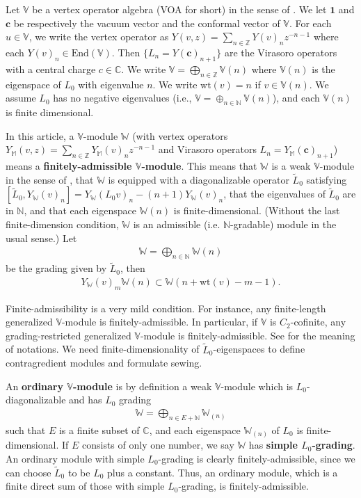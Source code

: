 \documentclass[12pt,a4paper,notitlepage]{article}
\theoremstyle{definition}
\theoremstyle{plain}
\newcommand{\wtd}{\widetilde}
\newcommand{\End}{\mathrm{End}} %
\newcommand{\id}{\mathbf{1}}
\newcommand{\Vbb}{\mathbb V}
\newcommand{\Wbb}{\mathbb W}
\newcommand{\Mbb}{\mathbb M}
\newcommand{\Cbb}{\mathbb C}
\newcommand{\Nbb}{\mathbb N}
\newcommand{\Zbb}{\mathbb Z}
\newcommand{\cbf}{\mathbf c}
\newcommand{\wt}{\mathrm{wt}}
\numberwithin{equation}{section}
\begin{document}
Let $\Vbb$ be a vertex operator algebra (VOA for short) in the sense of \cite{FHL93}. We let $\id$ \index{1@$\id$} and $\cbf$ \index{c@$\cbf$} be respectively the vacuum vector and the conformal vector of $\Vbb$. For each $u\in\Vbb$, we write the vertex operator as $Y(v,z)=\sum_{n\in\Zbb}Y(v)_nz^{-n-1}$ where each $Y(v)_n\in\End(\Vbb)$. Then $\{L_n=Y(\cbf)_{n+1} \}$ are the Virasoro operators with a central charge  $c\in\Cbb$. We write $\Vbb=\bigoplus_{n\in\Zbb}\Vbb(n)$ where $\Vbb(n)$ is the eigenspace of $L_0$ with eigenvalue $n$. We write $\wt(v)=n$ if $v\in\Vbb(n)$. We assume $L_0$ has no negative eigenvalues (i.e., $\Vbb=\oplus_{n\in\Nbb}\Vbb(n)$), and each $\Vbb(n)$ is finite dimensional.


In this article,  a $\Vbb$-module $\Wbb$ (with vertex operators $Y_\Mbb(v,z)=\sum_{n\in\Zbb}Y_\Mbb(v)_nz^{-n-1}$ and Virasoro operators $L_n=Y_\Mbb(\cbf)_{n+1}$) means a \textbf{finitely-admissible $\Vbb$-module}. This means that $\Wbb$ is a weak $\Vbb$-module in the sense of \cite{DLM97}, that $\Wbb$ is equipped with a diagonalizable operator $\wtd L_0$ satisfying $[\wtd L_0,Y_\Wbb(v)_n]=Y_\Wbb(L_0 v)_n-(n+1)Y_\Wbb(v)_n$, \index{L0@$\wtd L_0$}  that the eigenvalues of $\wtd L_0$ are in $\Nbb$, and that each eigenspace $\Wbb(n)$ is finite-dimensional. (Without the last finite-dimension condition, $\Wbb$ is an admissible (i.e. $\Nbb$-gradable) module in the usual sense.) Let \index{W@$\Wbb(n),\Wbb_{(n)}$}
\begin{align*}
\Wbb=\bigoplus_{n\in\Nbb}\Wbb(n)	
\end{align*}
be the grading given by $\wtd L_0$, then \begin{align}
Y_\Wbb(v)_m\Wbb(n)\subset \Wbb(n+\wt(v)-m-1).\label{eq40}
\end{align}

Finite-admissibility is a very mild condition. For instance, any finite-length generalized $\Vbb$-module is finitely-admissible. In particular, if $\Vbb$ is $C_2$-cofinite, any grading-restricted generalized $\Vbb$-module is finitely-admissible. See \cite{Hua09} for the meaning of notations. We need finite-dimensionality of $\wtd L_0$-eigenspaces to define contragredient modules and formulate sewing.

An \textbf{ordinary $\Vbb$-module} is by definition a weak $\Vbb$-module which is $L_0$-diagonalizable and has $L_0$ grading \index{W@$\Wbb(n),\Wbb_{(n)}$}
\begin{align*}
	\Wbb=\bigoplus_{n\in E+\Nbb}\Wbb_{(n)}
\end{align*}
such that $E$ is a finite subset of $\Cbb$, and each eigenspace $\Wbb_{(n)}$ of $L_0$ is finite-dimensional. If $E$ consists of only one number, we say $\Wbb$ has \textbf{simple $L_0$-grading}. An ordinary module with simple $L_0$-grading is clearly finitely-admissible, since we can choose $\wtd L_0$ to be $L_0$ plus a constant. Thus, an ordinary module, which is a finite direct sum of those with simple $L_0$-grading, is finitely-admissible.
\end{document}
